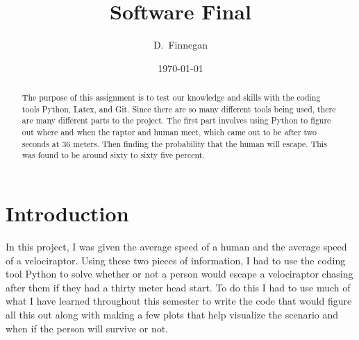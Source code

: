 \documentclass[twocolumn]{revtex4}
\begin{document}
\title{
Software Final
}

\author{D.~Finnegan}


\date{\today}

\begin{abstract}
	The purpose of this assignment is to test our knowledge and skills with the coding tools Python, Latex, and Git. Since there are so many different tools being used, there are many different parts to the project. The first part involves using Python to figure out where and when the raptor and human meet, which came out to be after two seconds at 36 meters. Then finding the probability that the human will escape. This was found to be around sixty to sixty five percent.  	
\end{abstract}

\maketitle

\section{Introduction}
In this project, I was given the average speed of a human and the average speed of a velociraptor. Using these two pieces of information, I had to use the coding tool Python to solve whether or not a person would escape a velociraptor chasing after them if they had a thirty meter head start. To do this I had to use much of what I have learned throughout this semester to write the code that would figure all this out along with making a few plots that help visualize the scenario and when if the person will survive or not. 
\end{document}
